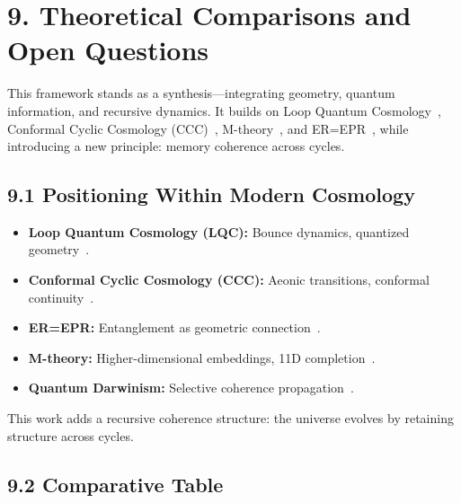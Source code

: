 \section*{9. Theoretical Comparisons and Open Questions}

This framework stands as a synthesis—integrating geometry, quantum information, and recursive dynamics. It builds on Loop Quantum Cosmology~\cite{ashtekar2006quantum, bojowald2001absence}, Conformal Cyclic Cosmology (CCC)~\cite{penrose2010cycles}, M-theory~\cite{witten1995string}, and ER=EPR~\cite{maldacena2013cool}, while introducing a new principle: memory coherence across cycles.

\subsection*{9.1 Positioning Within Modern Cosmology}

\begin{itemize}
  \item \textbf{Loop Quantum Cosmology (LQC):} Bounce dynamics, quantized geometry~\cite{ashtekar2006quantum, bojowald2001absence}.
  \item \textbf{Conformal Cyclic Cosmology (CCC):} Aeonic transitions, conformal continuity~\cite{penrose2010cycles}.
  \item \textbf{ER=EPR:} Entanglement as geometric connection~\cite{maldacena2013cool}.
  \item \textbf{M-theory:} Higher-dimensional embeddings, 11D completion~\cite{witten1995string}.
  \item \textbf{Quantum Darwinism:} Selective coherence propagation~\cite{zurek_quantum_2009, zurek_environment-induced_2003}.
\end{itemize}

This work adds a recursive coherence structure: the universe evolves by retaining structure across cycles.

\subsection*{9.2 Comparative Table}

